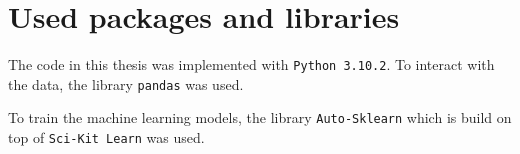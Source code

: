 \section{Used packages and libraries}\label{sec:used_packages_and_libraries} %
The code in this thesis was implemented with \texttt{Python 3.10.2}. To interact with the data, the library \texttt{pandas} was used.

To train the machine learning models, the library \texttt{Auto-Sklearn} which is build on top of \texttt{Sci-Kit Learn} was used.
